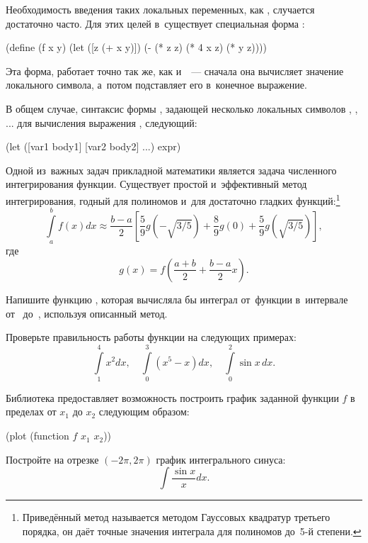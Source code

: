 Необходимость введения таких локальных переменных, как , случается достаточно часто. Для этих целей в~\Scheme существует специальная форма :

\begin{Definition}[emph={x,y,z}]
(define (f x y)
  (let ([z (+ x y)])
    (- (* z z) (* 4 x z) (* y z))))
\end{Definition}

Эта форма, работает точно так же, как и~~--- сначала она вычисляет значение локального символа, а~потом подставляет его в~конечное выражение.

В общем случае, синтаксис формы , задающей несколько локальных символов , , ... для вычисления выражения , следующий:
\begin{SchemeCode}
(let ([var1 body1]
      [var2 body2] ...)
  expr)
\end{SchemeCode}


\begin{Assignment}

Одной из~важных задач прикладной математики является задача численного интегрирования функции. Существует простой и~эффективный метод интегрирования, годный для полиномов и~для достаточно гладких функций:\footnote{Приведённый метод называется методом Гауссовых квадратур третьего порядка, он даёт точные значения интеграла для полиномов до~5-й степени.}
$$\int\limits_a^b f(x) dx \approx \frac{b-a}2\left[ \frac59 g\left(-\sqrt{3/5}\right)+\frac89g(0)+\frac59g\left(\sqrt{3/5}\right)\right],$$ где $$g(x)=f\left(\frac{a+b}2+\frac{b-a}2x\right).$$

Напишите функцию , которая вычисляла бы интеграл от~функции  в~интервале от~ до~, используя описанный метод.

Проверьте правильность работы функции на следующих примерах:
$$\int\limits_1^4 x^2 dx,\quad \int\limits_0^3 (x^5-x) dx,\quad \int\limits_0^2 \sin x\,dx.$$

Библиотека  предоставляет возможность построить график заданной функции $f$ в пределах от $x_1$ до $x_2$ следующим образом:
\begin{SchemeCode}
  (plot (function $f$ $x_1$ $x_2$))
\end{SchemeCode}
Постройте на отрезке $(-2\pi, 2\pi)$ график интегрального синуса: $$\int\frac{\sin x}{x} dx.$$ 

\end{Assignment}

